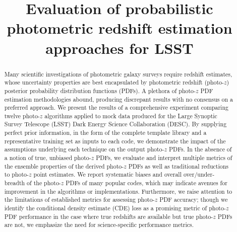 \documentclass[\docopts]{\docclass}
\begin{document}
\linenumbers

\title{Evaluation of probabilistic photometric redshift estimation approaches for \textsc{LSST}}

\maketitlepre

\begin{abstract}

Many scientific investigations of photometric galaxy surveys require redshift estimates, whose uncertainty properties are best encapsulated by photometric redshift (photo-$z$) posterior probability distribution functions (PDFs).
A plethora of photo-$z$ PDF estimation methodologies abound, producing discrepant results with no consensus on a preferred approach.
We present the results of a comprehensive experiment comparing twelve photo-$z$ algorithms applied to mock data produced for the Large Synoptic Survey Telescope (\textsc{LSST}) Dark Energy Science Collaboration (\textsc{DESC}).
By supplying perfect prior information, in the form of the complete template library and a representative training set as inputs to each code, we demonstrate the impact of the assumptions underlying each technique on the output photo-$z$ PDFs.
In the absence of a notion of true, unbiased photo-$z$ PDFs, we evaluate and interpret multiple metrics of the ensemble properties of the derived photo-$z$ PDFs as well as traditional reductions to photo-$z$ point estimates.
We report systematic biases and overall over/under-breadth of the photo-$z$ PDFs of many popular codes, which may indicate avenues for improvement in the algorithms or implementations.
Furthermore, we raise attention to the limitations of established metrics for assessing photo-$z$ PDF accuracy; though we identify the conditional density estimate (CDE) loss as a promising metric of photo-$z$ PDF performance in the case where true redshifts are available but true photo-$z$ PDFs are not, we emphasize the need for science-specific performance metrics.

\end{abstract}


\maketitlepost







\end{document}
